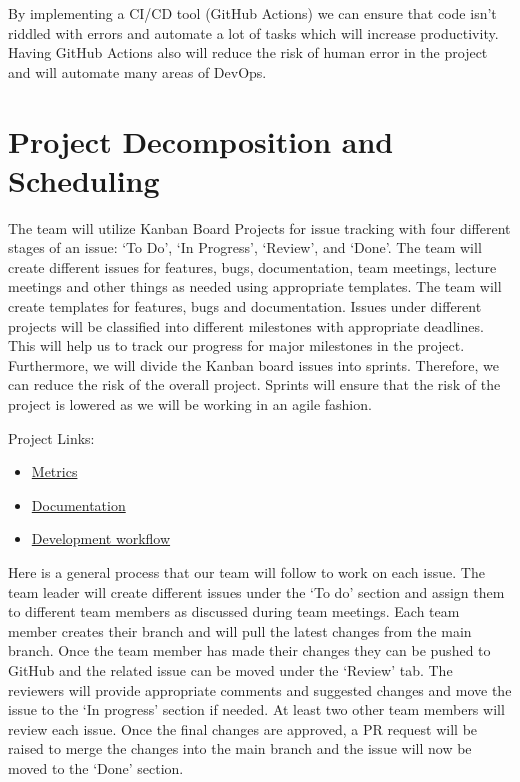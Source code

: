 \documentclass{article}
\begin{document}
By implementing a CI/CD tool (GitHub Actions) we can ensure that code isn't riddled with errors and automate a lot of tasks which will increase productivity. Having GitHub Actions also will reduce the risk of human error in the project and will automate many areas of DevOps.

\section{Project Decomposition and Scheduling}

The team will utilize Kanban Board Projects for issue tracking with four different stages of an issue: ‘To Do’, ‘In Progress’, ‘Review’, and ‘Done’. The team will create different issues for features, bugs, documentation, team meetings, lecture meetings and other things as needed using appropriate templates. The team will create templates for features, bugs and documentation. Issues under different projects will be classified into different milestones with appropriate deadlines. This will help us to track our progress for major milestones in the project. Furthermore, we will divide the Kanban board issues into sprints. Therefore, we can reduce the risk of the overall project. Sprints will ensure that the risk of the project is lowered as we will be working in an agile fashion.

Project Links:
\begin{itemize}
\item  
\href{https://github.com/users/Inreet-Kaur/projects/4}{Metrics}
\item  
\href{https://github.com/users/Inreet-Kaur/projects/2}{Documentation} 
\item 
\href{https://github.com/users/Inreet-Kaur/projects/6}{Development workflow}
\end{itemize}

Here is a general process that our team will follow to work on each issue. The team leader will create different issues under the ‘To do’ section and assign them to different team members as discussed during team meetings. Each team member creates their branch and will pull the latest changes from the main branch. Once the team member has made their changes they can be pushed to GitHub and the related issue can be moved under the ‘Review’ tab. The reviewers will provide appropriate comments and suggested changes and move the issue to the ‘In progress’ section if needed. At least two other team members will review each issue. Once the final changes are approved, a PR request will be raised to merge the changes into the main branch and the issue will now be moved to the ‘Done’ section. 
\end{document}
